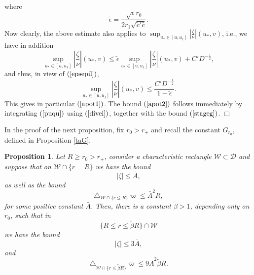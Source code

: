 \documentclass{article}
\newtheorem{proposition}{Proposition}[section]
\newcommand{\zn}{\frac{\zeta}{\nu}}
\begin{document}
where
\begin{equation}
\label{tildeorism}
\tilde{\epsilon}=\frac{\sqrt{\epsilon}r_0}{2r_1\sqrt{\tilde{c}'\hat{c}}}.
\end{equation}
Now clearly, the above estimate also applies to
$\sup_{u_*\in[u,u_1]}\left|\zn\right|(u_*,v)$, i.e., we have
in addition
\[
\sup_{u_*\in[u,u_1]}\left|\zn\right|(u_*,v)
\le
\tilde{\epsilon}\sup_{u_*\in[u,u_1]}\left|\zn\right|(u_*,v)
+C'D^{-\frac12},
\]
and thus, in view of $(\ref{epsepil})$,
\begin{equation}
\label{divei}
\sup_{u_*\in[u,u_1]}\left|\zn\right|(u_*,v)
\le\frac{C'D^{-\frac12}}{1-\tilde{\epsilon}}.
\end{equation}
This gives in particular $(\ref{apot1})$.
The bound $(\ref{apot2})$ follows immediately by integrating $(\ref{puqu})$ using
$(\ref{divei})$, together with the bound $(\ref{stageg})$.
$\Box$

In the proof of the next proposition, fix $r_0>r_+$
and recall the constant $G_{r_0}$,
defined in Proposition \ref{taG}.
\begin{proposition}
\label{metobeta}
Let $R\ge r_0>r_+$, consider a characteristic
rectangle $\mathcal{W}\subset\mathcal{D}$
and suppose that on $\mathcal{W}\cap\{r=R\}$ we
have the bound
\[
|\zeta|\le \bar{A},
\]
as well as the bound
\[
\triangle_{\mathcal{W}\cap\{r\le R\}} \varpi\le \bar{A}^2R,
\]
for some positive constant $\bar{A}$.
Then, there is a constant $\tilde{\beta}>1$, depending
only on $r_0$, such that in 
\[
\{R\le r\le\tilde\beta R\}\cap{\mathcal{W}}
\]
we have the bound
\[
|\zeta|\le 3\bar{A},
\]
and
\[
\triangle_{\mathcal{W}\cap\{r\le \tilde{\beta}R\}} \varpi\le 9 \bar{A}^2\tilde{\beta}R.
\]
\end{proposition}
\end{document}
